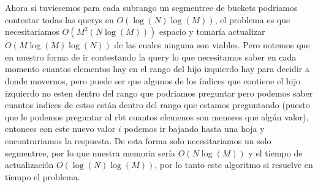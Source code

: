 \documentclass[letterpaper]{article}
\theoremstyle{definition}
\theoremstyle{lemathm}
\theoremstyle{lemathm}
\theoremstyle{lemathm}
\theoremstyle{lemademthm}
\newcommand{\1}{\mathbbm{1}}
\begin{document}
	Ahora si tuviesemos para cada subrango un segmentree de buckets podriamos contestar todas las querys en $O(\log(N)\log(M))$, el problema es que necesitariamos $O(M^2(N\log(M)))$ espacio y tomaría actualizar $O(M\log(M)\log(N))$ de las cuales ninguna son viables. Pero notemos que en nuestro forma de ir contestando la query lo que necesitamos saber en cada momento cuantos elementos hay en el rango del hijo izquierdo hay para decidir a donde movernos, pero puede ser que algunos de los índices que contiene el hijo izquierdo no esten dentro del rango que podriamos preguntar pero podemos saber cuantos indices de estos están dentro del rango que estamos preguntando (puesto que le podemos preguntar al rbt cuantos elemenos son menores que algún valor), entonces con este nuevo valor $i$ podemos ir bajando hasta una hoja y encontrariamos la respuesta. De esta forma solo necesitariamos un solo segmentree, por lo que nuestra memoria sería $O(N\log(M))$ y el tiempo de actualización $O(\log(N)\log(M))$, por lo tanto este algoritmo si resuelve en tiempo el problema.
\end{document}
